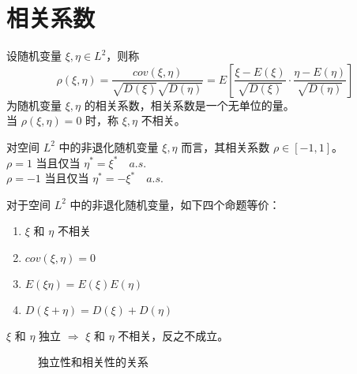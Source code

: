 \documentclass[12pt,a4paper]{amsart}
\begin{document}
\section{相关系数}

\begin{definition}[相关系数]
    设随机变量 $\xi, \eta \in L^2$，则称
    \begin{equation}
        \rho(\xi, \eta) = \frac{cov(\xi, \eta)}{\sqrt{D(\xi)}\sqrt{D(\eta)}} = E\left[\frac{\xi - E(\xi)}{\sqrt{D(\xi)}}\cdot\frac{\eta - E(\eta)}{\sqrt{D(\eta)}}\right]
    \end{equation}
    为随机变量 $\xi, \eta$ 的相关系数，相关系数是一个无单位的量。 \\
    当 $\rho(\xi, \eta) = 0$ 时，称 $\xi, \eta$ 不相关。
\end{definition}

\begin{proposition}[相关系数的范围]
    对空间 $L^2$ 中的非退化随机变量 $\xi, \eta$ 而言，其相关系数 $\rho\in[-1, 1]$。 \\
    $\rho = 1$ 当且仅当 $\eta^* = \xi^* \quad a.s.$ \\
    $\rho = -1$ 当且仅当 $\eta^* = -\xi^* \quad a.s.$
\end{proposition}

\begin{proposition}
    对于空间 $L^2$ 中的非退化随机变量，如下四个命题等价：
    \begin{enumerate}
        \item $\xi$ 和 $\eta$ 不相关
        \item $cov(\xi, \eta) = 0$
        \item $E(\xi\eta) = E(\xi)E(\eta)$
        \item $D(\xi+\eta) = D(\xi) + D(\eta)$
    \end{enumerate}
\end{proposition}

\begin{proposition}[独立性和相关性的关系]
    $\xi$ 和 $\eta$ 独立 $\Rightarrow$ $\xi$ 和 $\eta$ 不相关，反之不成立。
\end{proposition}

\begin{figure}[htbp]
    \centering
    \caption{独立性和相关性的关系}
    \label{fig:venn}
\end{figure}



\appendix



{\footnotesize}
\end{document}
